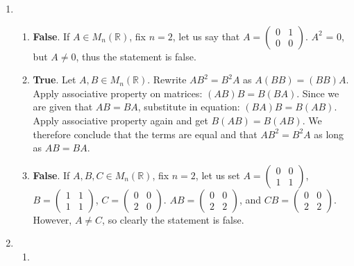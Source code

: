 \documentclass{article}
\begin{document}
\begin{enumerate}
\item

\begin{enumerate}

\item \textbf{False}. If  $A \in M_{n}(\mathbb{R})$, fix $n = 2$, let us say that $A =  \left(\begin{array}{cc} 0 & 1 \\ 0 & 0 \end{array} \right)$. $A^{2}$ = 0, but $A \neq 0$, thus the statement is false.
\item \textbf{True}. Let $A,B \in M_{n}(\mathbb{R})$. Rewrite $AB^{2} = B^{2}A$ as $A(BB) = (BB)A$. Apply associative property on matrices: $(AB)B = B(BA)$. Since we are given that $AB = BA$, substitute in equation: $(BA)B = B(AB)$. Apply associative property again and get $B(AB) = B(AB)$. We therefore conclude that the terms are equal and that $AB^2 = B^2A$ as long as $AB = BA$.
\item \textbf{False}. If $A,B,C \in M_{n}(\mathbb{R})$, fix $n = 2$, let us set
$A = \left(\begin{array}{cc} 0 & 0 \\ 1 & 1 \end{array} \right)$,
$B = \left(\begin{array}{cc} 1 & 1 \\ 1 & 1 \end{array} \right)$,
$C = \left(\begin{array}{cc} 0 & 0 \\ 2 & 0 \end{array} \right)$.
$AB = \left(\begin{array}{cc} 0 & 0 \\ 2 & 2 \end{array} \right)$, and $CB = \left(\begin{array}{cc} 0 & 0 \\ 2 & 2 \end{array} \right)$. However, $A \neq C$, so clearly the statement is false.

\end{enumerate}

\item

\begin{enumerate}

\item

\end{enumerate}

\end{enumerate}
\end{document}
